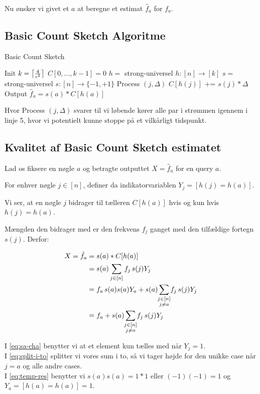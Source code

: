 Nu ønsker vi givet et $a$ at beregne et estimat $\hat f_a$ for $f_a$.

\subsection{Basic Count Sketch Algoritme}

\begin{algorithm}[H] \caption{Basic Count Sketch} \label{alg:bcs}
  \nonl Init\;
  $k = \left\lceil \frac{4}{\epsilon^2} \right\rceil$\;
  $C[0, \dots, k-1] = 0$\;
  $h =$ strong-universel $h : [n] \rightarrow [k]$\;
  $s =$ strong-universel $s : [n] \rightarrow \{-1, +1 \}$\;
  \nonl Process $(j, \Delta)$\;
  $C[h(j)]$ += $s(j) * \Delta$\;
  \nonl Output\;
  \Return $\hat f_a = s(a) * C[h(a)]$
\end{algorithm}\vspace{1em}

Hvor Process $(j, \Delta)$ svarer til vi løbende kører alle par i strømmen igennem i linje 5, hvor vi potentielt kunne stoppe på et vilkårligt tidspunkt.\\

\subsection{Kvalitet af Basic Count Sketch estimatet}
Lad os fiksere en nøgle $a$ og betragte outputtet $X = \hat f_a$ for en query $a$.

For enhver nøgle $j \in [n]$, definer da indikatorvariablen $Y_j = [h(j) = h(a)]$.

Vi ser, at en nøgle $j$ bidrager til tælleren $C[h(a)]$ hvis og kun hvis $h(j) = h(a)$.

Mængden den bidrager med er den frekvens $f_j$ ganget med den tilfældige fortegn $s(j)$. Derfor:

\begin{align}
  X = \hat f_a
  &= s(a) * C[h(a)] \nonumber \\
  &= s(a) \sum_{j \in [n]} f_j \, s(j) Y_j \label{eq:sa-cha} \\
  &= f_a \, s(a) s(a) Y_a + s(a) \summ{j \in [n]\\ j \neq a} f_j \, s(j) Y_j \label{eq:split-i-to} \\
  &= f_a + s(a) \summ{j \in [n]\\ j \neq a} f_j \, s(j) Y_j \label{eq:temp-res}
\end{align}

I \cref{eq:sa-cha} benytter vi at et element kun tælles med når $Y_j = 1$.\\
I \cref{eq:split-i-to} splitter vi vores sum i to, så vi tager højde for den unikke case når $j=a$ og alle andre cases.\\
I \cref{eq:temp-res} benytter vi $s(a)s(a) = 1*1$ eller $(-1)(-1) = 1$ og $Y_a = [h(a) = h(a)] = 1$.\\


